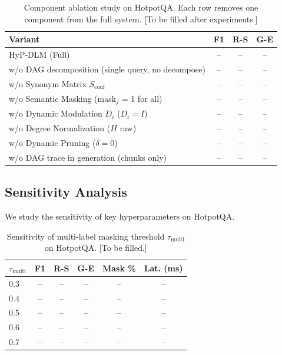 \documentclass[11pt,a4paper]{article}
\begin{document}
\begin{table}[ht]
\centering
\caption{Component ablation study on HotpotQA. Each row removes one component from the full system. [To be filled after experiments.]}
\label{tab:ablation}
\begin{tabular}{l ccc}
\toprule
Variant & F1 & R-S & G-E \\
\midrule
HyP-DLM (Full) & -- & -- & -- \\
\midrule
w/o DAG decomposition (single query, no decompose) & -- & -- & -- \\
w/o Synonym Matrix $S_{\text{conf}}$ & -- & -- & -- \\
w/o Semantic Masking (mask$_j$ = 1 for all) & -- & -- & -- \\
w/o Dynamic Modulation $D_i$ ($D_i = I$) & -- & -- & -- \\
w/o Degree Normalization ($H$ raw) & -- & -- & -- \\
w/o Dynamic Pruning ($\delta = 0$) & -- & -- & -- \\
w/o DAG trace in generation (chunks only) & -- & -- & -- \\
\bottomrule
\end{tabular}
\end{table}

\subsection{Sensitivity Analysis}

We study the sensitivity of key hyperparameters on HotpotQA.

\begin{table}[ht]
\centering
\caption{Sensitivity of multi-label masking threshold $\tau_{\text{multi}}$ on HotpotQA. [To be filled.]}
\label{tab:sens_mask}
\begin{tabular}{l ccc cc}
\toprule
$\tau_{\text{multi}}$ & F1 & R-S & G-E & Mask \% & Lat. (ms) \\
\midrule
0.3 & -- & -- & -- & -- & -- \\
0.4 & -- & -- & -- & -- & -- \\
0.5 & -- & -- & -- & -- & -- \\
0.6 & -- & -- & -- & -- & -- \\
0.7 & -- & -- & -- & -- & -- \\
\bottomrule
\end{tabular}
\end{table}
\end{document}
